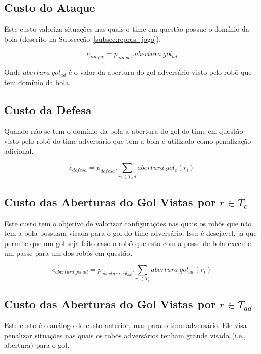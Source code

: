 \subsection{Custo do Ataque}
Este custo valoriza situações nas quais o time em questão
possue o domínio da bola (descrito na Subsecção~\ref{subsec:repres_jogo}).

\begin{dmath} 
 c_{ataque} = p_{ataque} . abertura{\ }gol_{ad}
\end{dmath} 

Onde $abertura{\ }gol_{ad}$ é o valor da abertura do gol adversário visto
pelo robô que tem domínio da bola.

\subsection{Custo da Defesa}
Quando não se tem o domínio da bola a abertura do gol do time em questão
visto pelo robô do time adversário que tem a bola é utilizado
como penalização adicional.

\begin{dmath}
  c_{defesa} = p_{defesa} .
   \sum_{r_i \in T_ad} abertura{\ }gol_c(r_i)
\end{dmath}

\subsection{Custo das Aberturas do Gol Vistas por $r\in T_c$}

Este custo tem o objetivo de valorizar configurações nas quais
os robôs que não tem a bola possuam visada para o gol do time
adversário. Isso
é desejavel, já que permite que um gol seja feito caso o robô
que esta com a posse de bola execute um passe para um dos robôs
em questão.

\begin{dmath}
   c_{abertura{\ }gol{\ }ad} = p_{abertura{\ }gol_{ad}} .
    \sum_{r_i \in T_c} abertura{\ }gol_{ad}(r_i)
\end{dmath}

\subsection{Custo das Aberturas do Gol Vistas por $r\in T_{ad}$}

Este custo é o análogo do custo anterior, mas para o
time adversário. Ele visa penalizar situações nas quais
os robôs adversários tenham grande visada (i.e., abertura)
para o gol. 

